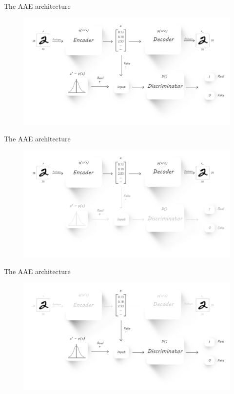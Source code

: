 \documentclass[10pt]{beamer}
\begin{document}
\begin{frame}{The AAE architecture}
\begin{figure}
  \centering
  \includegraphics[width=\linewidth]{../images/aae-architecture-01-alt.png}
\end{figure}
\end{frame}

\begin{frame}{The AAE architecture}
\begin{figure}
  \centering
  \includegraphics[width=\linewidth]{../images/aae-architecture-01-alt2.png}
\end{figure}
\end{frame}

\begin{frame}{The AAE architecture}
\begin{figure}
  \centering
  \includegraphics[width=\linewidth]{../images/aae-architecture-01-alt3.png}
\end{figure}
\end{frame}
\end{document}
